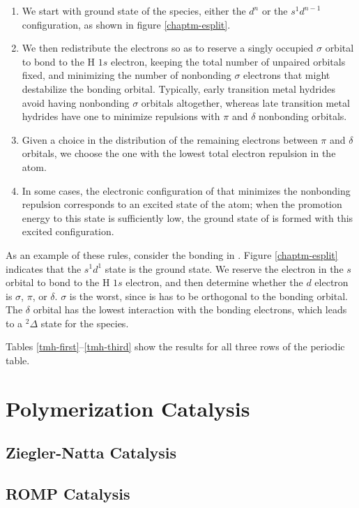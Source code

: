 \begin{enumerate}
\item We start with ground state of the  species, either the
$d^n$ or the $s^1d^{n-1}$ configuration, as shown in figure
\ref{chaptm-esplit}. 
\item We then redistribute the electrons so as to
reserve a singly occupied $\sigma$ orbital to bond to the H $1s$
electron, keeping the total number of unpaired orbitals fixed, and
minimizing the number of nonbonding $\sigma$ electrons that might
destabilize the bonding orbital. Typically, early transition metal
hydrides avoid having nonbonding $\sigma$ orbitals altogether,
whereas late transition metal hydrides have one to minimize repulsions
with $\pi$ and $\delta$ nonbonding orbitals. 
\item Given a choice in the distribution of the remaining electrons
between $\pi$ and $\delta$ orbitals, we choose the one with the lowest
total electron repulsion in the atom.
\item In some cases, the electronic configuration of  that
minimizes the nonbonding repulsion corresponds to an excited state of
the  atom; when the promotion energy to this state is
sufficiently low, the ground state of  is formed with this
excited configuration.
\end{enumerate}

As an example of these rules, consider the bonding in
. Figure \ref{chaptm-esplit} indicates that the $s^1d^1$
state is the ground state. We reserve the electron in the $s$ orbital
to bond to the H $1s$ electron, and then determine whether the $d$
electron is $\sigma$, $\pi$, or $\delta$. $\sigma$ is the worst, since
is has to be orthogonal to the bonding orbital. The $\delta$ orbital
has the lowest interaction with the bonding electrons, which leads to
a $^2\Delta$ state for the species.

Tables \ref{tmh-first}--\ref{tmh-third} show the results for all three
rows of the periodic table.




\section{Polymerization Catalysis}
\subsection{Ziegler-Natta Catalysis}
\subsection{ROMP Catalysis}

